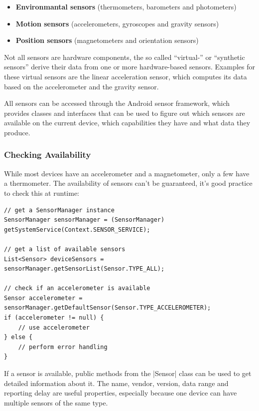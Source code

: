 \begin{itemize}[noitemsep]
	\item \textbf{Environmantal sensors} (thermometers, barometers and photometers)
	\item \textbf{Motion sensors} (accelerometers, gyroscopes and gravity sensors)
	\item \textbf{Position sensors} (magnetometers and orientation sensors)
\end{itemize}

Not all sensors are hardware components, the so called ``virtual-'' or ``synthetic sensors'' derive their data from one or more hardware-based sensors.
Examples for these virtual sensors are the linear acceleration sensor, which computes its data based on the accelerometer and the gravity sensor.

All sensors can be accessed through the Android sensor framework, which provides classes and interfaces that can be used to figure out which sensors are available on the current device, which capabilities they have and what data they produce.

\subsubsection{Checking Availability}
\label{sec:implementation:checkingavailability}
While most devices have an accelerometer and a magnetometer, only a few have a thermometer.
The availability of sensors can't be guaranteed, it's good practice to check this at runtime:

\begin{lstlisting}[label=getsensormanager]
// get a SensorManager instance
SensorManager sensorManager = (SensorManager) getSystemService(Context.SENSOR_SERVICE);

// get a list of available sensors
List<Sensor> deviceSensors = sensorManager.getSensorList(Sensor.TYPE_ALL);

// check if an accelerometer is available
Sensor accelerometer = sensorManager.getDefaultSensor(Sensor.TYPE_ACCELEROMETER);
if (accelerometer != null) {
	// use accelerometer
} else {
	// perform error handling
}
\end{lstlisting}

If a sensor is available, public methods from the |Sensor|\cite{androiddocs:sensor} class can be used to get detailed information about it.
The name, vendor, version, data range and reporting delay are useful properties, especially because one device can have multiple sensors of the same type.

